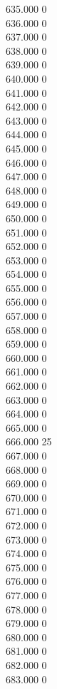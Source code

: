 { 635.000	0 \\
 636.000	0 \\
 637.000	0 \\
 638.000	0 \\
 639.000	0 \\
 640.000	0 \\
 641.000	0 \\
 642.000	0 \\
 643.000	0 \\
 644.000	0 \\
 645.000	0 \\
 646.000	0 \\
 647.000	0 \\
 648.000	0 \\
 649.000	0 \\
 650.000	0 \\
 651.000	0 \\
 652.000	0 \\
 653.000	0 \\
 654.000	0 \\
 655.000	0 \\
 656.000	0 \\
 657.000	0 \\
 658.000	0 \\
 659.000	0 \\
 660.000	0 \\
 661.000	0 \\
 662.000	0 \\
 663.000	0 \\
 664.000	0 \\
 665.000	0 \\
 666.000	25 \\
 667.000	0 \\
 668.000	0 \\
 669.000	0 \\
 670.000	0 \\
 671.000	0 \\
 672.000	0 \\
 673.000	0 \\
 674.000	0 \\
 675.000	0 \\
 676.000	0 \\
 677.000	0 \\
 678.000	0 \\
 679.000	0 \\
 680.000	0 \\
 681.000	0 \\
 682.000	0 \\
 683.000	0 \\
}
